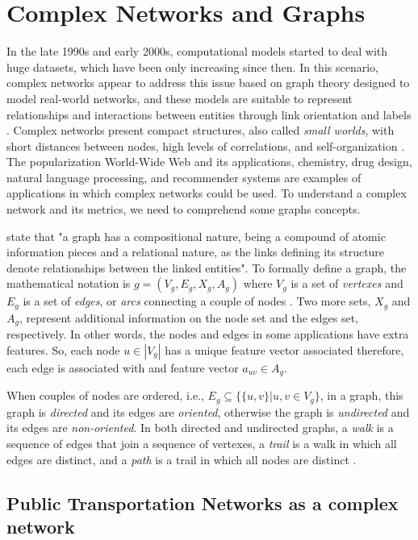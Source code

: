 \section{Complex Networks and Graphs}
In the late 1990s and early 2000s, computational models started to 
deal with huge datasets, which have been only increasing since then. 
In this scenario, complex networks appear to address this issue
based on graph theory designed to model real-world networks, and these models
are suitable to represent relationships and interactions 
between entities through link orientation and labels \cite{barabasiCN}.
Complex networks present compact structures, also called {\em small worlds},
with short distances between nodes, high levels of correlations, and self-organization
\cite{ferber2012}.
The popularization World-Wide Web and its applications, chemistry, drug 
design, natural language processing, and recommender
systems are examples of applications in which complex networks could be used.
To understand a complex network and its metrics, we need to comprehend 
some graphs concepts.

 state that "a graph has a compositional nature, being 
a compound of atomic information pieces and a relational nature, as the links
defining its structure denote relationships between the linked entities".
To formally define a graph, the mathematical notation is  \textit{$g = (V_g, E_g, X_g, A_g)$}
where $V_g$ is a set of {\em vertexes} and $E_g$ is a set of {\em edges}, or {\em arcs} 
connecting a couple of nodes \cite{graph}. Two more sets, $X_g$ and $A_g$, represent additional information on the node set and the edges set, respectively. In other words, the nodes and edges in some applications have extra features. So, each node $u \in |V_g|$
has a unique feature vector associated therefore, each edge is associated with 
and feature vector $a_{uv} \in A_g$. 

When couples of nodes are ordered, i.e., 
$E_g \subseteq \{\{u,v \} | u,v \in V_g\}$, in a graph, this graph is {\em directed} and its 
edges are {\em oriented}, otherwise the graph is {\em undirected} and its edges 
are {\em non-oriented}. In both directed and undirected graphs, a {\em walk} is a sequence of 
edges that join a sequence of vertexes, a {\em trail} is a walk in which all edges are distinct,
and a {\em path} is a trail in which all nodes are distinct
\cite{williamsonlists}.

\subsection{Public Transportation Networks as a complex network}

